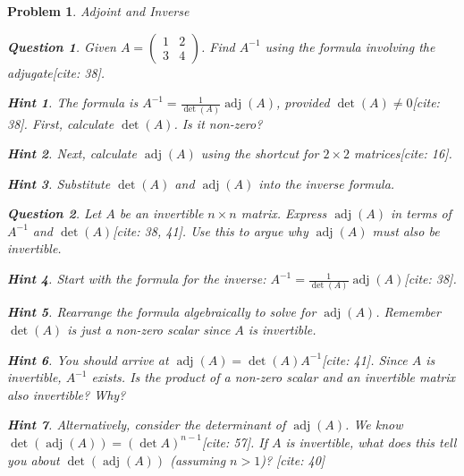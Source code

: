 \documentclass[12pt]{article}
\newtheorem{problem}{Problem}[section]
\newtheorem{question}{Question}[problem]
\theoremstyle{definition}
\newtheorem{hint}{Hint}[question]
\newcommand{\adj}{\operatorname{adj}}
\newcommand{\detm}{\operatorname{det}}
\begin{document}
\begin{problem}{Adjoint and Inverse}
    \begin{question}
        Given $A = \begin{pmatrix} 1 & 2 \\ 3 & 4 \end{pmatrix}$. Find $A^{-1}$ using the formula involving the adjugate[cite: 38].
    \end{question}
    
        \begin{hint}
            The formula is $A^{-1} = \frac{1}{\detm(A)} \adj(A)$, provided $\detm(A) \neq 0$[cite: 38]. First, calculate $\detm(A)$. Is it non-zero?
        \end{hint}
        \begin{hint}
            Next, calculate $\adj(A)$ using the shortcut for $2 \times 2$ matrices[cite: 16].
        \end{hint}
        \begin{hint}
            Substitute $\detm(A)$ and $\adj(A)$ into the inverse formula.
        \end{hint}
    

    \begin{question}
        Let $A$ be an invertible $n \times n$ matrix. Express $\adj(A)$ in terms of $A^{-1}$ and $\detm(A)$[cite: 38, 41]. Use this to argue why $\adj(A)$ must also be invertible.
    \end{question}
    
        \begin{hint}
            Start with the formula for the inverse: $A^{-1} = \frac{1}{\detm(A)} \adj(A)$[cite: 38].
        \end{hint}
        \begin{hint}
            Rearrange the formula algebraically to solve for $\adj(A)$. Remember $\detm(A)$ is just a non-zero scalar since $A$ is invertible.
        \end{hint}
        \begin{hint}
            You should arrive at $\adj(A) = \detm(A) A^{-1}$[cite: 41]. Since $A$ is invertible, $A^{-1}$ exists. Is the product of a non-zero scalar and an invertible matrix also invertible? Why?
        \end{hint}
        \begin{hint}
             Alternatively, consider the determinant of $\adj(A)$. We know $\detm(\adj(A)) = (\detm A)^{n-1}$[cite: 57]. If $A$ is invertible, what does this tell you about $\detm(\adj(A))$ (assuming $n>1$)? [cite: 40]
        \end{hint}
    


\end{problem}
\end{document}

